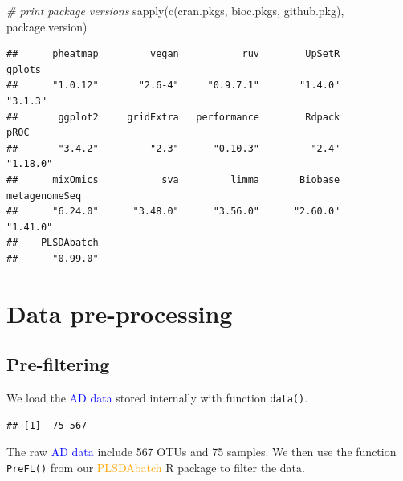 \documentclass[
]{book}
\newenvironment{Shaded}{\begin{snugshade}}{\end{snugshade}}
\newcommand{\CommentTok}[1]{\textcolor[rgb]{0.56,0.35,0.01}{\textit{#1}}}
\newcommand{\FunctionTok}[1]{\textcolor[rgb]{0.00,0.00,0.00}{#1}}
\newcommand{\NormalTok}[1]{#1}
\newcommand{\OtherTok}[1]{\textcolor[rgb]{0.56,0.35,0.01}{#1}}
\newcommand{\SpecialCharTok}[1]{\textcolor[rgb]{0.00,0.00,0.00}{#1}}
\newcommand{\StringTok}[1]{\textcolor[rgb]{0.31,0.60,0.02}{#1}}
\begin{document}
\begin{Shaded}
\begin{Highlighting}[]
\CommentTok{\# print package versions}
\FunctionTok{sapply}\NormalTok{(}\FunctionTok{c}\NormalTok{(cran.pkgs, bioc.pkgs, github.pkg), package.version)}
\end{Highlighting}
\end{Shaded}

\begin{verbatim}
##      pheatmap         vegan           ruv        UpSetR        gplots 
##      "1.0.12"       "2.6-4"     "0.9.7.1"       "1.4.0"       "3.1.3" 
##       ggplot2     gridExtra   performance        Rdpack          pROC 
##       "3.4.2"         "2.3"      "0.10.3"         "2.4"      "1.18.0" 
##      mixOmics           sva         limma       Biobase metagenomeSeq 
##      "6.24.0"      "3.48.0"      "3.56.0"      "2.60.0"      "1.41.0" 
##    PLSDAbatch 
##      "0.99.0"
\end{verbatim}

\hypertarget{data-pre-processing}{%
\section{Data pre-processing}\label{data-pre-processing}}

\hypertarget{pre-filtering}{%
\subsection{Pre-filtering}\label{pre-filtering}}

We load the \textcolor{blue}{AD data} stored internally with function \texttt{data()}.

\begin{Shaded}
\end{Shaded}

\begin{verbatim}
## [1]  75 567
\end{verbatim}

The raw \textcolor{blue}{AD data} include 567 OTUs and 75 samples. We then use the function \texttt{PreFL()} from our \textcolor{orange}{PLSDAbatch} R package to filter the data.
\end{document}
